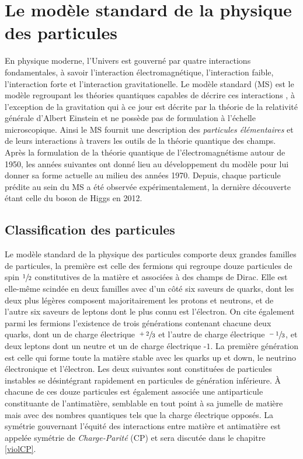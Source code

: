     \chapter{Le modèle standard de la physique des particules}

    En physique moderne, l'Univers est gouverné par quatre interactions fondamentales, à savoir l'interaction électromagnétique, l'interaction faible, l'interaction forte et l'interaction gravitationelle. Le modèle standard (MS) est le modèle regroupant les théories quantiques capables de décrire ces interactions \cite{SM1,SM2,SM3}, à l'exception de la gravitation qui à ce jour est décrite par la théorie de la relativité générale d'Albert Einstein et ne possède pas de formulation à l'échelle microscopique. Ainsi le MS fournit une description des \textit{particules élémentaires} et de leurs interactions à travers les outils de la théorie quantique des champs. Après la formulation de la théorie quantique de l'électromagnétisme autour de 1950, les années suivantes ont donné lieu au développement du modèle pour lui donner sa forme actuelle au milieu des années 1970. Depuis, chaque particule prédite au sein du MS a été observée expérimentalement, la dernière découverte étant celle du boson de Higgs en 2012.

    \section{Classification des particules}

    Le modèle standard de la physique des particules comporte deux grandes familles de particules, la première est celle des fermions qui regroupe douze particules de spin $\sfrac{1}{2}$ constitutives de la matière et associées à des champs de Dirac. Elle est elle-même scindée en deux familles avec d'un côté six saveurs de quarks, dont les deux plus légères composent majoritairement les protons et neutrons, et de l'autre six saveurs de leptons dont le plus connu est l'électron. On cite également parmi les fermions l'existence de trois générations contenant chacune deux quarks, dont un de charge électrique $\sfrac{+2}{3}$ et l'autre de charge électrique $\sfrac{-1}{3}$, et deux leptons dont un neutre et un de charge électrique -$1$. La première génération est celle qui forme toute la matière stable avec les quarks up et down, le neutrino électronique et l'électron. Les deux suivantes sont constituées de particules instables se désintégrant rapidement en particules de génération inférieure. À chacune de ces douze particules est également associée une antiparticule constituante de l'antimatière, semblable en tout point à sa jumelle de matière mais avec des nombres quantiques tels que la charge électrique opposés. La symétrie gouvernant l'équité des interactions entre matière et antimatière est appelée symétrie de \textit{Charge-Parité} (CP) et sera discutée dans le chapitre \ref{violCP}.


